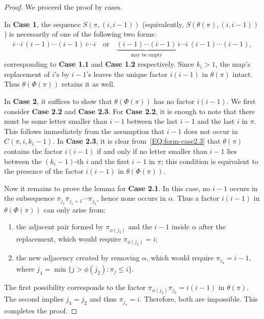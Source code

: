 \documentclass[10pt,a4paper]{amsart}
\begin{document}
\begin{proof}
	We proceed the proof by cases.
	
	In \textbf{Case 1}, the sequence $S(\pi,(i,i-1))$ (equivalently, $S(\theta(\pi),(i,i-1))$) is necessarily of one of the following two forms:
	\begin{align*}%
	i\cdots i\,(i-1)\cdots(i-1)\,i\cdots i
	\quad\text{or}\quad
	\underbrace{(i-1)\cdots(i-1)}_{\text{may be empty}}\,i\cdots i\,(i-1)\cdots(i-1),
	\end{align*}
	corresponding to {\bf Case 1.1} and {\bf Case 1.2} respectively. Since $k_i>1$, the map's replacement of $i$'s by $i-1$'s leaves the unique factor $i(i-1)$ in $\theta(\pi)$ intact. Thus $\theta(\Phi(\pi))$ retains it as well.
	
	In \textbf{Case 2}, it suffices to show that $\theta(\Phi(\pi))$ has no factor $i(i-1)$. We first consider \textbf{Case 2.2} and \textbf{Case 2.3}. For \textbf{Case 2.2}, it is enough to note that there must be some letter smaller than $i-1$ between the last $i-1$ and the last $i$ in $\pi$. This follows immediately from the assumption that $i-1$ does not occur in $C(\pi,i,k_i-1)$. In \textbf{Case 2.3}, it is clear from~\eqref{EQ:form-case2.3} that $\theta(\pi)$ contains the factor $i(i-1)$ if and only if no letter smaller than $i-1$ lies between the $(k_i-1)$-th $i$ and the first $i-1$ in $\pi$; this condition is equivalent to the presence of the factor $i(i-1)$ in $\theta(\Phi(\pi))$.
	
	Now it remains to prove the lemma for \textbf{Case 2.1}. In this case, no $i-1$ occurs in the subsequence $\pi_{j_1}\pi_{j_1+1}\cdots\pi_{j_2}$, hence none occurs in $\alpha$. Thus a factor $i(i-1)$ in $\theta(\Phi(\pi))$ can only arise from:
	\begin{enumerate}
		\item the adjacent pair formed by $\pi_{\phi(j_3)}$ and the $i-1$ inside $\alpha$ after the replacement, which would require $\pi_{\phi(j_3)}=i$;
		\item the new adjacency created by removing $\alpha$, which would require $\pi_{j_4}=i-1$, where $j_4=\min\{j>\phi(j_2): \pi_j\le i\}$.
	\end{enumerate}
	The first possibility corresponds to the factor $\pi_{\phi(j_3)}\pi_{j_3}=i(i-1)$ in $\theta(\pi)$. The second implies $j_4=j_2$ and thus $\pi_{j_4}=i$. Therefore, both are impossible. This completes the proof.
\end{proof}
\end{document}
